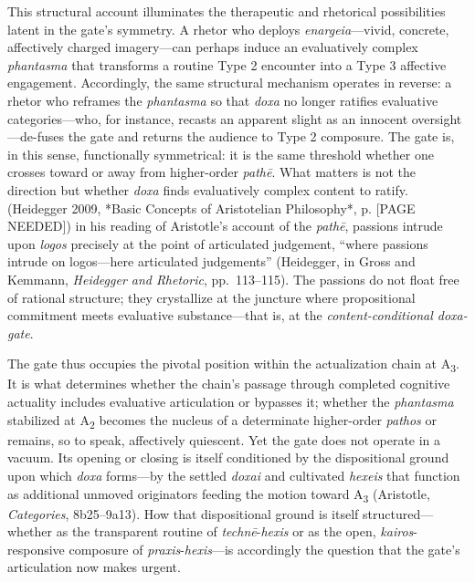 \documentclass{article}
\begin{document}
This structural account illuminates the therapeutic and rhetorical possibilities latent in the gate's symmetry. A rhetor who deploys \textit{enargeia}---vivid, concrete, affectively charged imagery---can perhaps induce an evaluatively complex \textit{phantasma} that transforms a routine Type 2 encounter into a Type 3 affective engagement. Accordingly, the same structural mechanism operates in reverse: a rhetor who reframes the \textit{phantasma} so that \textit{doxa} no longer ratifies evaluative categories---who, for instance, recasts an apparent slight as an innocent oversight---de-fuses the gate and returns the audience to Type 2 composure. The gate is, in this sense, functionally symmetrical: it is the same threshold whether one crosses toward or away from higher-order \textit{pathē}. What matters is not the direction but whether \textit{doxa} finds evaluatively complex content to ratify. (Heidegger 2009, *Basic Concepts of Aristotelian Philosophy*, p. [PAGE NEEDED]) in his reading of Aristotle's account of the \textit{pathē}, passions intrude upon \textit{logos} precisely at the point of articulated judgement, ``where passions intrude on logos---here articulated judgements'' (Heidegger, in Gross and Kemmann, \textit{Heidegger and Rhetoric}, pp.~113--115). The passions do not float free of rational structure; they crystallize at the juncture where propositional commitment meets evaluative substance---that is, at the \textit{content-conditional doxa-gate}.

The gate thus occupies the pivotal position within the actualization chain at A\textsubscript{3}. It is what determines whether the chain's passage through completed cognitive actuality includes evaluative articulation or bypasses it; whether the \textit{phantasma} stabilized at A\textsubscript{2} becomes the nucleus of a determinate higher-order \textit{pathos} or remains, so to speak, affectively quiescent. Yet the gate does not operate in a vacuum. Its opening or closing is itself conditioned by the dispositional ground upon which \textit{doxa} forms---by the settled \textit{doxai} and cultivated \textit{hexeis} that function as additional unmoved originators feeding the motion toward A\textsubscript{3} (Aristotle, \textit{Categories}, 8b25--9a13). How that dispositional ground is itself structured---whether as the transparent routine of \textit{technē}-\textit{hexis} or as the open, \textit{kairos}-responsive composure of \textit{praxis}-\textit{hexis}---is accordingly the question that the gate's articulation now makes urgent.
\end{document}
